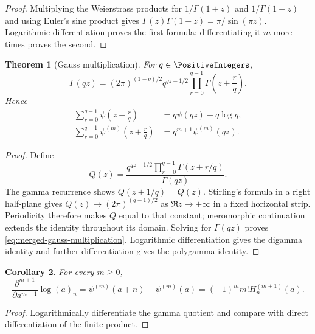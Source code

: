 \documentclass[11pt,a4paper,oneside,openany]{book}
\newtheorem{theorem}{Theorem}[chapter]
\newtheorem{corollary}[theorem]{Corollary}
\theoremstyle{definition}
\theoremstyle{remark}
\begin{document}
\begin{proof}
Multiplying the Weierstrass products for $1/\Gamma(1+z)$ and
$1/\Gamma(1-z)$ and using Euler's sine product gives
$\Gamma(z)\Gamma(1-z)=\pi/\sin(\pi z)$.  Logarithmic differentiation proves
the first formula; differentiating it $m$ more times proves the second.
\end{proof}

\begin{theorem}[Gauss multiplication]
\label{thm:merged-gauss-multiplication}
For $q\in\PositiveIntegers$,
\begin{equation}
 \Gamma(qz)=(2\pi)^{(1-q)/2}q^{qz-1/2}
 \prod_{r=0}^{q-1}\Gamma\!\left(z+\frac rq\right).                 \label{eq:merged-gauss-multiplication}
\end{equation}
Hence
\begin{align}
 \sum_{r=0}^{q-1}\psi\!\left(z+\frac rq\right)
 &=q\psi(qz)-q\log q,                                              \label{eq:merged-digamma-mult}\\
 \sum_{r=0}^{q-1}\psi^{(m)}\!\left(z+\frac rq\right)
 &=q^{m+1}\psi^{(m)}(qz).                                          \label{eq:merged-polygamma-mult}
\end{align}
\end{theorem}

\begin{proof}
Define
\[
 Q(z)=\frac{q^{qz-1/2}\prod_{r=0}^{q-1}\Gamma(z+r/q)}{\Gamma(qz)}.
\]
The gamma recurrence shows $Q(z+1/q)=Q(z)$.  Stirling's formula in a right
half-plane gives $Q(z)\to(2\pi)^{(q-1)/2}$ as $\Re z\to+\infty$ in a fixed
horizontal strip.  Periodicity therefore makes $Q$ equal to that constant;
meromorphic continuation extends the identity throughout its domain.  Solving
for $\Gamma(qz)$ proves \eqref{eq:merged-gauss-multiplication}.  Logarithmic
differentiation gives the digamma identity and further differentiation gives
the polygamma identity.
\end{proof}

\begin{corollary}
For every $m\geq0$,
\begin{equation}
 \frac{\partial^{m+1}}{\partial a^{m+1}}\log(a)_n
 =\psi^{(m)}(a+n)-\psi^{(m)}(a)
 =(-1)^m m!H_n^{(m+1)}(a).                                        \label{eq:merged-pochhammer-polygamma}
\end{equation}
\end{corollary}

\begin{proof}
Logarithmically differentiate the gamma quotient and compare with direct
differentiation of the finite product.
\end{proof}
\end{document}
